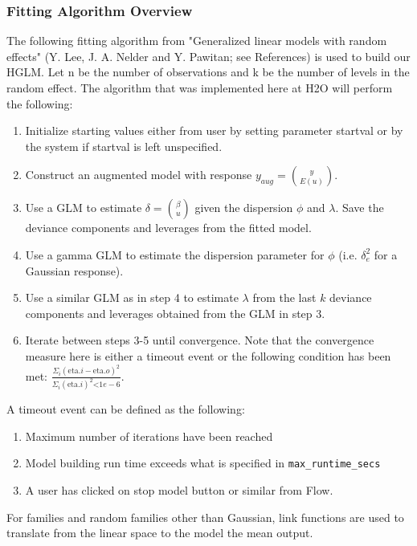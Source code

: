 \subsubsection{Fitting Algorithm Overview}

The following fitting algorithm from "Generalized linear models with random effects" (Y. Lee, J. A. Nelder and Y. Pawitan; see References) is used to build our HGLM. Let n be the number of observations and k be the number of levels in the random effect. The algorithm that was implemented here at H2O will perform the following:

\begin{enumerate}
    \item Initialize starting values either from user by setting parameter startval or by the system if startval is left unspecified.
    \item Construct an augmented model with response $y_{aug}= {y \choose {E(u)}}$.
    \item Use a GLM to estimate $\delta={\beta \choose u}$ given the dispersion $\phi$ and $\lambda$. Save the deviance components and leverages from the fitted model.
    \item Use a gamma GLM to estimate the dispersion parameter for $\phi$ (i.e. $\delta_e^2$ for a Gaussian response).
    \item Use a similar GLM as in step 4 to estimate $\lambda$ from the last $k$ deviance components and leverages obtained from the GLM in step 3.
    \item Iterate between steps 3-5 until convergence. Note that the convergence measure here is either a timeout event or the following condition has been met: $\frac {\Sigma_i{(\text{eta}. i - \text{eta}.o)^2}} {\Sigma_i(\text{eta}.i)^2 \text{<} 1e - 6}$.
\end{enumerate}
    
A timeout event can be defined as the following:

\begin{enumerate}
    \item Maximum number of iterations have been reached
    \item Model building run time exceeds what is specified in \texttt{max\_runtime\_secs}
    \item A user has clicked on stop model button or similar from Flow.
\end{enumerate}

For families and random families other than Gaussian, link functions are used to translate from the linear space to the model the mean output.


